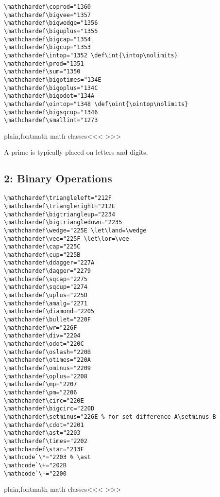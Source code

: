 {{\begin{verbatim}
\mathchardef\coprod="1360
\mathchardef\bigvee="1357
\mathchardef\bigwedge="1356
\mathchardef\biguplus="1355
\mathchardef\bigcap="1354
\mathchardef\bigcup="1353
\mathchardef\intop="1352 \def\int{\intop\nolimits}
\mathchardef\prod="1351
\mathchardef\sum="1350
\mathchardef\bigotimes="134E
\mathchardef\bigoplus="134C
\mathchardef\bigodot="134A
\mathchardef\ointop="1348 \def\oint{\ointop\nolimits}
\mathchardef\bigsqcup="1346
\mathchardef\smallint="1273
\end{verbatim}

\<plain,fontmath math classes\><<<
>>>


A prime is typically  placed on letters and digits.


\subsection{2: Binary Operations}

\begin{verbatim}
\mathchardef\triangleleft="212F
\mathchardef\triangleright="212E
\mathchardef\bigtriangleup="2234
\mathchardef\bigtriangledown="2235
\mathchardef\wedge="225E \let\land=\wedge
\mathchardef\vee="225F \let\lor=\vee
\mathchardef\cap="225C
\mathchardef\cup="225B
\mathchardef\ddagger="227A
\mathchardef\dagger="2279
\mathchardef\sqcap="2275
\mathchardef\sqcup="2274
\mathchardef\uplus="225D
\mathchardef\amalg="2271
\mathchardef\diamond="2205
\mathchardef\bullet="220F
\mathchardef\wr="226F
\mathchardef\div="2204
\mathchardef\odot="220C
\mathchardef\oslash="220B
\mathchardef\otimes="220A
\mathchardef\ominus="2209
\mathchardef\oplus="2208
\mathchardef\mp="2207
\mathchardef\pm="2206
\mathchardef\circ="220E
\mathchardef\bigcirc="220D
\mathchardef\setminus="226E % for set difference A\setminus B
\mathchardef\cdot="2201
\mathchardef\ast="2203
\mathchardef\times="2202
\mathchardef\star="213F
\mathcode`\*="2203 % \ast
\mathcode`\+="202B
\mathcode`\-="2200
\end{verbatim}

\<plain,fontmath math classes\><<<
>>>


}}
